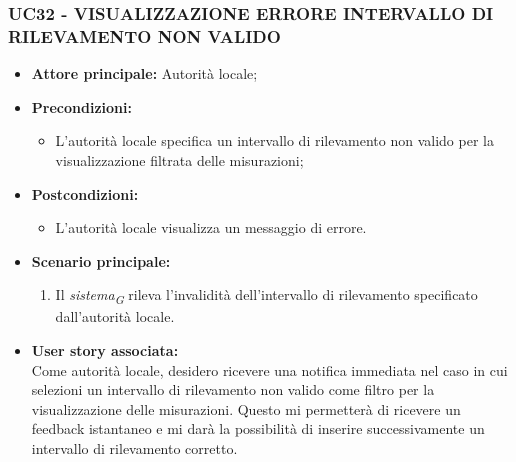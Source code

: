 \subsubsection{UC32 - VISUALIZZAZIONE ERRORE INTERVALLO DI RILEVAMENTO NON VALIDO}
\begin{itemize}
    \item \textbf{Attore principale:} Autorità locale;
    \item \textbf{Precondizioni:}
        \begin{itemize} 
            \item L'autorità locale specifica un intervallo di rilevamento non valido per la visualizzazione filtrata delle misurazioni;
        \end{itemize}
        \item \textbf{Postcondizioni:}
        \begin{itemize}
            \item L'autorità locale visualizza un messaggio di errore.
        \end{itemize}
        \item \textbf{Scenario principale:}
        \begin{enumerate}
            \item Il \textit{sistema}\textsubscript{\textit{G}} rileva l'invalidità dell'intervallo di rilevamento specificato dall'autorità locale.
            \end{enumerate}
    \item \textbf{User story associata:} \\
        Come autorità locale, desidero ricevere una notifica immediata nel caso in cui selezioni un intervallo di rilevamento non valido come filtro per la visualizzazione delle misurazioni. Questo mi permetterà di ricevere un feedback istantaneo e mi darà la possibilità di inserire successivamente un intervallo di rilevamento corretto.
\end{itemize}